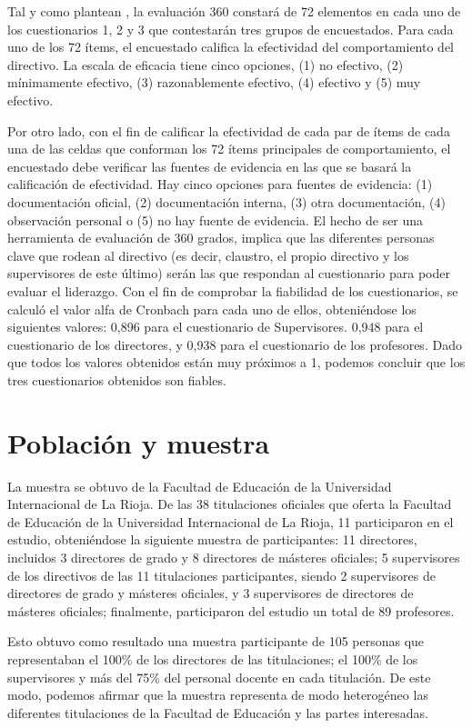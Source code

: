 \documentclass[spanish]{textolivre}
\begin{document}
Tal y como plantean \textcite{porter2008vanderbilt}, la evaluación 360 constará de 72 elementos en cada uno de los cuestionarios 1, 2 y 3 que contestarán tres grupos de encuestados. Para cada uno de los 72 ítems, el encuestado califica la efectividad del comportamiento del directivo. La escala de eficacia tiene cinco opciones, (1) no efectivo, (2) mínimamente efectivo, (3) razonablemente efectivo, (4) efectivo y (5) muy efectivo.

Por otro lado, con el fin de calificar la efectividad de cada par de ítems de cada una de las celdas que conforman los 72 ítems principales de comportamiento, el encuestado debe verificar las fuentes de evidencia en las que se basará la calificación de efectividad. Hay cinco opciones para fuentes de evidencia: (1) documentación oficial, (2) documentación interna, (3) otra documentación, (4) observación personal o (5) no hay fuente de evidencia. El hecho de ser una herramienta de evaluación de 360 grados, implica que las diferentes personas clave que rodean al directivo (es decir, claustro, el propio directivo y los supervisores de este último) serán las que respondan al cuestionario para poder evaluar el liderazgo. Con el fin de comprobar la fiabilidad de los cuestionarios, se calculó el valor alfa de Cronbach para cada uno de ellos, obteniéndose los siguientes valores: 0,896 para el cuestionario de Supervisores. 0,948 para el cuestionario de los directores, y 0,938 para el cuestionario de los profesores. Dado que todos los valores obtenidos están muy próximos a 1, podemos concluir que los tres cuestionarios obtenidos son fiables. 


\section{Población y muestra}
La muestra se obtuvo de la Facultad de Educación de la Universidad Internacional de La Rioja. De las 38 titulaciones oficiales que oferta la Facultad de Educación de la Universidad Internacional de La Rioja, 11 participaron en el estudio, obteniéndose la siguiente muestra de participantes: 11 directores, incluidos 3 directores de grado y 8 directores de másteres oficiales; 5 supervisores de los directivos de las 11 titulaciones participantes, siendo 2 supervisores de directores de grado y másteres oficiales, y 3 supervisores de directores de másteres oficiales; finalmente, participaron del estudio un total de 89 profesores.

Esto obtuvo como resultado una muestra participante de 105 personas que representaban el 100\% de los directores de las titulaciones; el 100\% de los supervisores y más del 75\% del personal docente en cada titulación. De este modo, podemos afirmar que la muestra representa de modo heterogéneo las diferentes titulaciones de la Facultad de Educación y las partes interesadas. 
\end{document}
